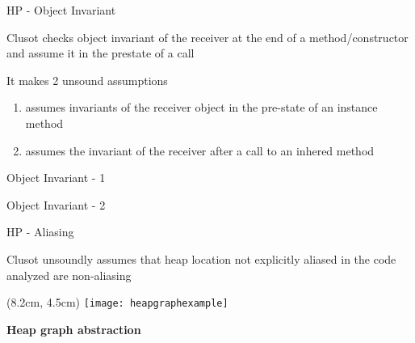 
\begin{frame}{HP - Object Invariant}

\vspace*{-0.4cm}

Clusot checks object invariant of the receiver at the end of a
method/constructor and assume it in the prestate of a call

\vfill

It makes 2 unsound assumptions
\begin{enumerate}
\item assumes invariants of the receiver object in the pre-state of an
instance method
\item assumes the invariant of the receiver after a call to an
inhered method
\end{enumerate}

\end{frame}


\begin{frame}[fragile]{Object Invariant - 1}
\vspace*{-0.4cm}
\only<1>{}
\end{frame}


\begin{frame}[fragile]{Object Invariant - 2}
\vspace*{-0.4cm}
\only<1>{}
\end{frame}


\begin{frame}{HP - Aliasing}

\vspace*{-0.4cm}

Clusot unsoundly assumes that heap location not explicitly aliased in the code
analyzed are non-aliasing

\vfill

\begin{textblock*}{1cm}(8.2cm, 4.5cm)
    \texttt{[image: heapgraphexample]}
\end{textblock*}

\textbf{Heap graph abstraction}


\end{frame}

